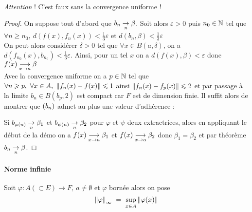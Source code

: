      \medskip
        
    \emph{Attention} ! C'est faux sans la convergence uniforme !
        
    \begin{proof}
        On suppose tout d'abord que $b_n \underset{n}{\rightarrow} \beta$. Soit alors $\varepsilon >0$ puis $n_0\in {\mathbb{N}}$ tel que $\forall n\geqslant n_0 ,~d(f(x),f_n(x) ) <\frac{1}{3} \varepsilon$ et $d(b_n ,\beta )< \frac{1}{3}\varepsilon$ \\ 
        On peut alors considérer $\delta >0$ tel que $\forall x\in B(a,\delta )$, on a $d(f_{n_0}(x), b_{n_0})<\frac{1}{3}\varepsilon$. Ainsi, pour un tel $x$ on a $d(f(x),\beta ) <\varepsilon$ donc $f(x) \underset{x \to a}{\longrightarrow} \beta$\\ 
        
        Avec la convergence uniforme on a $p\in{\mathbb{N}}$ tel que $\forall n\geqslant p ,~\forall x\in A,~\left\Vert f_n(x)-f(x) \right\Vert\leqslant 1$ ainsi $\left\Vert f_n(x)-f_p(x) \right\Vert \leqslant 2$ et par passage à la limite $b_n\in B(b_p ,2)$ est compact car $F$ est de dimension finie. Il suffit alors de montrer que $(b_n)$ admet au plus une valeur d'adhérence :
        
        Si $b_{\varphi (n)} \underset{n}{\rightarrow} \beta_1$ et $b_{\psi (n)} \underset{n}{\rightarrow} \beta_2$ pour $\varphi$ et $\psi$ deux extractrices, alors en appliquant le début de la 
        démo on a $f(x) \underset{x \to a}{\longrightarrow} \beta_1$ et $f(x) \underset{x \to a}{\longrightarrow} \beta_2$ donc $\beta_1 = \beta_2$ et par théorème 
        $b_n \underset{n}{\rightarrow} \beta$.
    \end{proof} \medskip

    \traitd
    \paragraph{Norme infinie}
        Soit $\varphi :A (\subset E) \rightarrow F ,~a\neq\emptyset$ et $\varphi$ bornée alors on pose 
        \[
			\norm{\varphi}_{\infty} ~=~ \underset{x\in A}{\mathrm{sup}} \norm{\varphi (x) }
		\vspace{-20pt}
		\] 
    \trait
    

